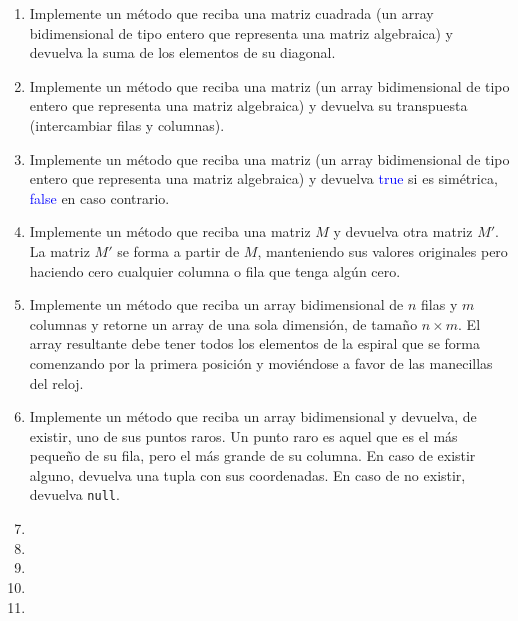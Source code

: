 \begin{enumerate}
    \item
    Implemente un método que reciba una matriz cuadrada (un array bidimensional de tipo entero que representa una matriz algebraica) y devuelva la suma de los elementos de su diagonal.

    \item
    Implemente un método que reciba una matriz (un array bidimensional de tipo entero que representa una matriz algebraica) y devuelva su transpuesta (intercambiar filas y columnas).

    \item 
    Implemente un método que reciba una matriz (un array bidimensional de tipo entero que representa una matriz algebraica) y devuelva \textcolor{blue}{true} si es simétrica, \textcolor{blue}{false} en caso contrario.

    \item
    Implemente un método que reciba una matriz \(M\) y devuelva otra matriz \(M'\). La matriz \(M'\) se forma a partir de \(M\), manteniendo sus valores originales pero haciendo cero cualquier columna o fila que tenga algún cero.

    \item
    Implemente un método que reciba un array bidimensional de \(n\) filas y \(m\) columnas y retorne un array de una sola dimensión, de tamaño \(n \times m\). El array resultante debe tener todos los elementos de la espiral que se forma comenzando por la primera posición y moviéndose a favor de las manecillas del reloj.

    \item
    Implemente un método que reciba un array bidimensional y devuelva, de existir, uno de sus puntos raros. Un punto raro es aquel que es el más pequeño de su fila, pero el más grande de su columna. En caso de existir alguno, devuelva una tupla con sus coordenadas. En caso de no existir, devuelva \texttt{null}.
    
    \item
    

    \item
    

    \item
    

    \item
    

    \item
    


\end{enumerate}
